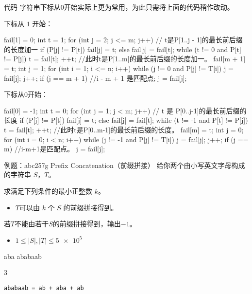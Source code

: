 \documentclass{ctexbeamer}
\begin{document}
\begin{frame}[fragile]{代码}
字符串下标从$0$开始实际上更为常用，为此只需将上面的代码稍作改动。

\begin{tcolorbox}[sidebyside]
下标从 $1$ 开始：

\begin{cverb}
fail[1] = 0;
int t = 1;
for (int j = 2; j <= m; j++) {
// t是P[1..j - 1]的最长前后缀的长度加一
  if (P[j] != P[t])
    fail[j] = t;
  else
    fail[j] = fail[t];
  while (t != 0 and P[t] != P[j])
    t = fail[t];
  ++t;
}
//此时t是P[1..m]的最长前后缀的长度加一。
fail[m + 1] = t;
int j = 1;
for (int i = 1; i <= n; i++) {
  while (j != 0 and P[j] != T[i])
    j = fail[j];
  j++;
  if (j == m + 1) {
    //i - m + 1 是匹配点;
    j = fail[j];
  }
}
\end{cverb}

\tcblower

下标从$0$开始：

\begin{cverb}[fontsize=\tiny]
fail[0] = -1;
int t = 0;
for (int j = 1; j < m; j++) {
// t 是 P[0..j-1]的最长前后缀的长度
  if (P[j] != P[t])
    fail[j] = t;
  else
    fail[j] = fail[t];
  while (t != -1 and P[t] != P[j])
    t = fail[t];
  ++t;
}
//此时t是P[0..m-1]的最长前后缀的长度。
fail[m] = t;
int j = 0;
for (int i = 0; i < n; i++) {
  while (j != -1 and P[j] != T[i])
    j = fail[j];
  j++;
  if (j == m) {
    //i-m+1是匹配点。
    j = fail[j];
  }
}
\end{cverb}
\end{tcolorbox}

\end{frame}


\begin{frame}[fragile]{例题：abc257g Prefix Concatenation（前缀拼接）}
给你两个由小写英文字母构成的字符串 $S$，$T$。

求满足下列条件的最小正整数 $k$。
\begin{itemize}
    \item $T$可以由 $k$ 个 $S$ 的前缀拼接得到。
\end{itemize}
若$T$不能由若干$S$的前缀拼接得到，输出$-1$。

\begin{itemize}
    \item $1 \le |S|, |T| \le \num{5e5}$
\end{itemize}

\begin{tcolorbox}[sidebyside,title=样例]
\begin{cverb}
aba
ababaab
\end{cverb}
\tcblower
\begin{cverb}
3
\end{cverb}
\end{tcolorbox}
\verb|ababaab = ab + aba + ab|
\end{frame}
\end{document}
